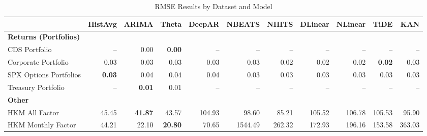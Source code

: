 
\begin{table}[htbp]
\centering
\caption{RMSE Results by Dataset and Model}
\label{tab:rmse_results}
\scriptsize
\setlength{\tabcolsep}{1.5pt}
\renewcommand{\arraystretch}{0.9}
\begin{tabular}{@{}lrrrrrrrrrr@{}}
\toprule
 & HistAvg & ARIMA & Theta & DeepAR & NBEATS & NHITS & DLinear & NLinear & TiDE & KAN \\
\midrule
\multicolumn{11}{l}{\textbf{Returns (Portfolios)}} \\
CDS Portfolio & -- & 0.00 & \textbf{0.00} & -- & -- & -- & -- & -- & -- & -- \\
Corporate Portfolio & 0.03 & 0.03 & 0.03 & 0.03 & 0.03 & 0.02 & 0.02 & 0.02 & \textbf{0.02} & 0.03 \\
SPX Options Portfolios & \textbf{0.03} & 0.04 & 0.04 & 0.04 & 0.03 & 0.03 & 0.03 & 0.03 & 0.03 & 0.03 \\
Treasury Portfolio & -- & \textbf{0.01} & 0.01 & -- & -- & -- & -- & -- & -- & -- \\
\midrule
\multicolumn{11}{l}{\textbf{Other}} \\
HKM All Factor & 45.45 & \textbf{41.87} & 43.57 & 104.93 & 98.60 & 85.21 & 105.52 & 106.78 & 105.53 & 95.90 \\
HKM Monthly Factor & 44.21 & 22.10 & \textbf{20.80} & 70.65 & 1544.49 & 262.32 & 172.93 & 196.16 & 153.58 & 363.03 \\
\bottomrule
\end{tabular}
\vspace{0.1cm}

\end{table}
